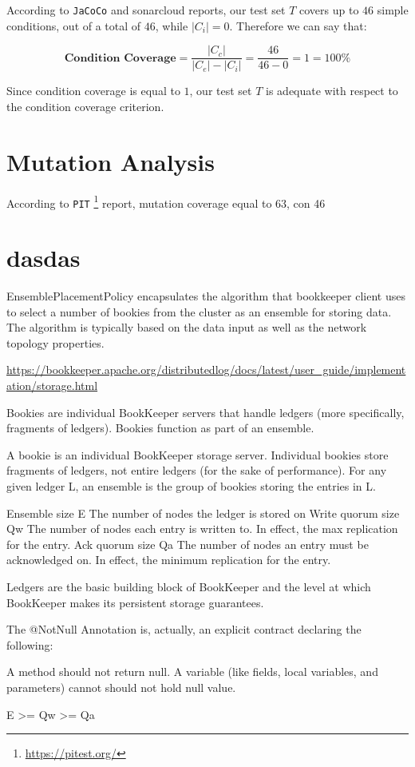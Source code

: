 \documentclass[conference]{IEEEtran}
\newcommand{\abs}[1]{\left|#1\right|}
\begin{document}
According to \texttt{JaCoCo} and sonarcloud reports, our test set $T$ covers up to $46$ simple conditions, out of a total of $46$, while $\abs{C_i} = 0$. Therefore we can say that:

\begin{equation} 
\textbf{Condition Coverage} = \dfrac{\abs{C_c}}{\abs{C_e} - \abs{C_i}} = \dfrac{46}{46-0} = 1 = 100\%
\end{equation}

Since condition coverage is equal to $1$, our test set $T$ is adequate with respect to the condition coverage criterion. 


\section{Mutation Analysis}


According to \texttt{PIT} \footnote{\url{https://pitest.org/}} report, mutation coverage equal to 63, con 46 



\section{dasdas}

EnsemblePlacementPolicy encapsulates the algorithm that bookkeeper client uses to select a number of bookies from the cluster as an ensemble for storing data. The algorithm is typically based on the data input as well as the network topology properties.

\url{https://bookkeeper.apache.org/distributedlog/docs/latest/user_guide/implementation/storage.html}



Bookies are individual BookKeeper servers that handle ledgers (more specifically, fragments of ledgers). Bookies function as part of an ensemble.

A bookie is an individual BookKeeper storage server. Individual bookies store fragments of ledgers, not entire ledgers (for the sake of performance). For any given ledger L, an ensemble is the group of bookies storing the entries in L.


Ensemble size	E	The number of nodes the ledger is stored on
Write quorum size	Qw	The number of nodes each entry is written to. In effect, the max replication for the entry.
Ack quorum size	Qa	The number of nodes an entry must be acknowledged on. In effect, the minimum replication for the entry.

Ledgers are the basic building block of BookKeeper and the level at which BookKeeper makes its persistent storage guarantees.

The @NotNull Annotation is, actually, an explicit contract declaring the following:

A method should not return null.
A variable (like fields, local variables, and parameters) cannot should not hold null value.

E >= Qw >= Qa





\end{document}
